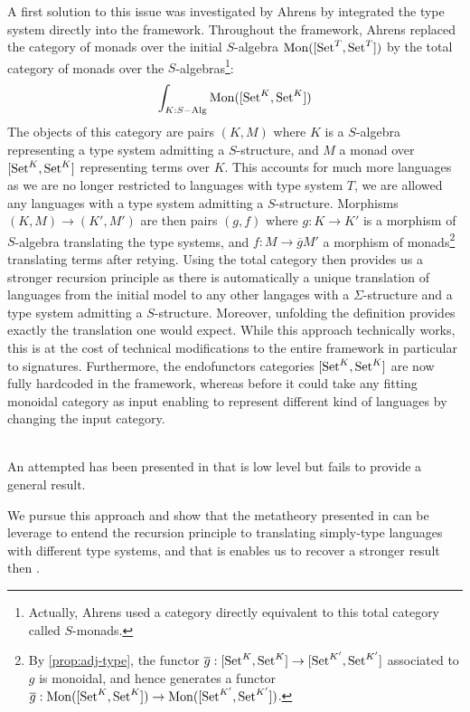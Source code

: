 A first solution to this issue was investigated by Ahrens \cite{ExtendedInitiality12}
by integrated the type system directly into the framework.
Throughout the framework, Ahrens replaced the category of monads over the
initial $S$-algebra $\operatorname{Mon}([\operatorname{Set}^{T},\operatorname{Set}^{T}])$ by the total category of
monads over the $S$-algebras\footnote{
  Actually, Ahrens used a category directly equivalent to this total
  category called $S$-monads.}:
%
\[\int_{K : S-\mathrm{Alg}} \operatorname{Mon}([\operatorname{Set}^K,\operatorname{Set}^K]) \]
%
The objects of this category are pairs $(K,M)$ where $K$ is a $S$-algebra
representing a type system admitting a $S$-structure, and $M$ a monad over
$[\operatorname{Set}^{K},\operatorname{Set}^{K}]$ representing terms over $K$.
This accounts for much more languages as we are no longer restricted to
languages with type system $T$, we are allowed any languages with a type
system admitting a $S$-structure.
Morphisms $(K,M) \to (K',M')$ are then pairs $(g,f)$ where $g : K \to K'$ is
a morphism of $S$-algebra translating the type systems, and $f : M \to \overline{g}M'$
a morphism of monads\footnote{
  By \cref{prop:adj-type}, the functor $\overline{g} : [\operatorname{Set}^K,\operatorname{Set}^K] \to [\operatorname{Set}^{K'},\operatorname{Set}^{K'}]$
  associated to $g$ is monoidal, and hence generates a functor
  $\overline{g} : \operatorname{Mon}([\operatorname{Set}^K,\operatorname{Set}^K]) \to \operatorname{Mon}([\operatorname{Set}^{K'},\operatorname{Set}^{K'}])$.
}
translating terms after retying.
Using the total category then provides us a stronger recursion principle as
there is automatically a unique translation of languages from the initial model
to any other langages with a $\Sigma$-structure and a type system admitting a $S$-structure.
Moreover, unfolding the definition provides exactly the translation one would expect.
While this approach technically works, this is at the cost of technical modifications
to the entire framework in particular to signatures.
Furthermore, the endofunctors categories $[\operatorname{Set}^K,\operatorname{Set}^K]$ are now fully hardcoded
in the framework, whereas before it could take any fitting monoidal category as input
enabling to represent different kind of languages by changing the input category.

 \\
An attempted has been presented in \cite{IntroductionIS24} that is low level
but fails to provide a general result.

We pursue this approach and show that the metatheory presented in
 can be leverage to entend the recursion principle to
translating simply-type languages with different type systems, and that is
enables us to recover a stronger result then \cite{ExtendedInitiality12}.

